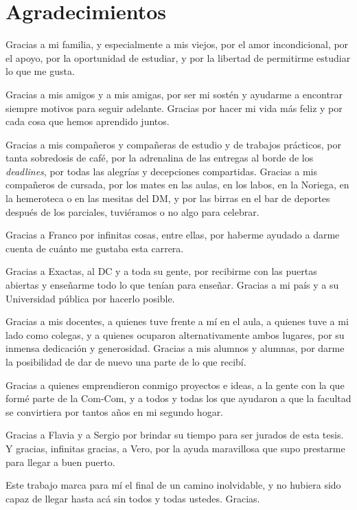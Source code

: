 \chapter*{Agradecimientos}

Gracias a mi familia, y especialmente a mis viejos, por el amor incondicional,
por el apoyo, por la oportunidad de estudiar, y por la libertad de permitirme
estudiar lo que me gusta.

Gracias a mis amigos y a mis amigas, por ser mi sostén y ayudarme a encontrar
siempre motivos para seguir adelante.
Gracias por hacer mi vida más feliz y por cada cosa que hemos aprendido juntos.

Gracias a mis compañeros y compañeras de estudio y de trabajos prácticos, por
tanta sobredosis de café, por la adrenalina de las entregas al borde de los
\emph{deadlines}, por todas las alegrías y decepciones compartidas.
Gracias a mis compañeros de cursada, por los mates en las aulas, en los labos,
en la Noriega, en la hemeroteca o en las mesitas del DM, y por las birras en el
bar de deportes después de los parciales, tuviéramos o no algo para celebrar.

Gracias a Franco por infinitas cosas, entre ellas, por haberme ayudado a darme
cuenta de cuánto me gustaba esta carrera.

Gracias a Exactas, al DC y a toda su gente, por recibirme con las puertas
abiertas y enseñarme todo lo que tenían para enseñar. Gracias a mi país y a su
Universidad pública por hacerlo posible.

Gracias a mis docentes, a quienes tuve frente a mí en el aula, a quienes tuve a
mi lado como colegas, y a quienes ocuparon alternativamente ambos lugares,
por su inmensa dedicación y
generosidad.
Gracias a mis alumnos y alumnas, por darme la posibilidad de dar de nuevo una
parte de lo que recibí.

Gracias a quienes emprendieron conmigo proyectos e ideas, a la gente con la que
formé parte de la Com-Com, y a todos y todas los que ayudaron a que la facultad
se convirtiera por tantos años en mi segundo hogar.

Gracias a Flavia y a Sergio por brindar su tiempo para ser jurados de esta
tesis.
Y gracias, infinitas gracias, a Vero, por la ayuda maravillosa que supo
prestarme para llegar a buen puerto.

Este trabajo marca para mí el final de un camino inolvidable, y no hubiera sido
capaz de llegar hasta acá sin todos y todas ustedes. Gracias.
